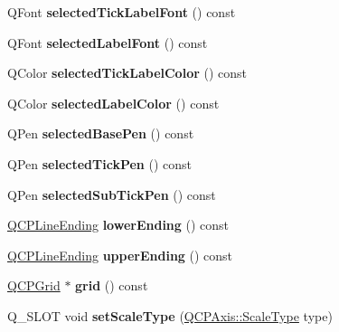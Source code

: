\begin{DoxyCompactItemize}
Q\+Font {\bfseries selected\+Tick\+Label\+Font} () const
\item 
\mbox{\label{class_q_c_p_axis_a1399d614f7c307159bfec938a069203d}} 
Q\+Font {\bfseries selected\+Label\+Font} () const
\item 
\mbox{\label{class_q_c_p_axis_a75f11d3031a11559f3e984e916fcde2c}} 
Q\+Color {\bfseries selected\+Tick\+Label\+Color} () const
\item 
\mbox{\label{class_q_c_p_axis_a7adea64ef4b715e7a1c519fff2b110b8}} 
Q\+Color {\bfseries selected\+Label\+Color} () const
\item 
\mbox{\label{class_q_c_p_axis_a0d54314ab3053fd0fb77294a0e7f08cb}} 
Q\+Pen {\bfseries selected\+Base\+Pen} () const
\item 
\mbox{\label{class_q_c_p_axis_a76b52a6d824ccf9a95eb024251e1b833}} 
Q\+Pen {\bfseries selected\+Tick\+Pen} () const
\item 
\mbox{\label{class_q_c_p_axis_a73c147bb2c5598edbb842adc2da8a7bf}} 
Q\+Pen {\bfseries selected\+Sub\+Tick\+Pen} () const
\item 
\mbox{\label{class_q_c_p_axis_a0cc60e5694ed4df6a2c3554e53ee6ae7}} 
\hyperlink{class_q_c_p_line_ending}{Q\+C\+P\+Line\+Ending} {\bfseries lower\+Ending} () const
\item 
\mbox{\label{class_q_c_p_axis_a9feaf5f78286693e89221bc205f9389a}} 
\hyperlink{class_q_c_p_line_ending}{Q\+C\+P\+Line\+Ending} {\bfseries upper\+Ending} () const
\item 
\mbox{\label{class_q_c_p_axis_a7c64f212e542bcb2acea9e414259bb4f}} 
\hyperlink{class_q_c_p_grid}{Q\+C\+P\+Grid} $\ast$ {\bfseries grid} () const
\item 
\mbox{\label{class_q_c_p_axis_ac5a0e28e2e93b66ef8d39a5bb7a6bdfb}} 
Q\+\_\+\+S\+L\+OT void {\bfseries set\+Scale\+Type} (\hyperlink{class_q_c_p_axis_a36d8e8658dbaa179bf2aeb973db2d6f0}{Q\+C\+P\+Axis\+::\+Scale\+Type} type)
\item 

\end{DoxyCompactItemize}
